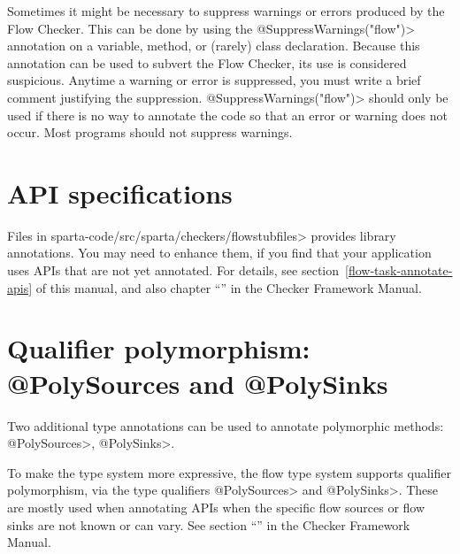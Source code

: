 Sometimes it might be necessary to suppress warnings or errors produced by
the Flow Checker.  This can be done by using the
\<@SuppressWarnings("flow")> annotation on a variable, method, or (rarely)
class declaration.  Because this annotation can be used to subvert the Flow
Checker, its use is considered suspicious.  Anytime a warning or error is
suppressed, you must write a brief comment justifying the suppression.
\<@SuppressWarnings("flow")> should only be used if there is no way to
annotate the code so that an error or warning does not occur.  Most
programs should not suppress warnings.


\section{API specifications\label{sec:apispecs}}

Files in  \<sparta-code/src/sparta/checkers/flowstubfiles> provides library
annotations.  You may need to enhance them, if you find that your application
uses APIs that are not yet annotated.  For details, see
section~\ref{flow-task-annotate-apis} of this manual, and also 
chapter
``'' in the Checker Framework Manual.


\section{Qualifier polymorphism: @PolySources  and @PolySinks \label{sec:polyflowsources}}

Two additional type annotations can be used to annotate polymorphic
methods: \<@PolySources>, \<@PolySinks>.

To make the type system more expressive, the flow type system supports
qualifier polymorphism, via the type qualifiers \<@PolySources> and
\<@PolySinks>.  These are mostly used when annotating APIs when the
specific flow sources or flow sinks are not known or can vary. 
See section ``'' in the Checker Framework Manual.  


